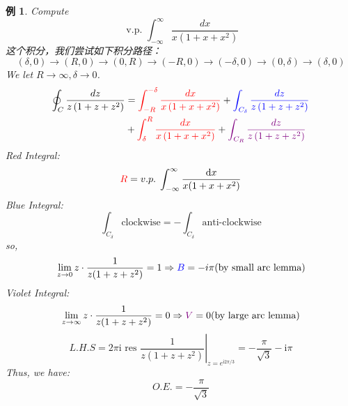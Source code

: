 \documentclass[10pt, a4paper, oneside]{ctexbook}
\newtheorem{example}[theorem]{例}
\def\D{\mathrm{d}}
\begin{document}
\begin{example}
    Compute $$\text { v.p. } \int_{-\infty}^{\infty} \frac{d x}{x\left(1+x+x^{2}\right)}$$
    \rm 这个积分，我们尝试如下积分路径：
    $$(\delta,0)\to(R,0)\to(0,R)\to(-R,0)\to(-\delta,0)\to(0,\delta)\to(\delta,0)$$
    We let $R\to\infty, \delta\to0$.
    $$
        \begin{aligned}
            \oint_{C} \frac{d z}{z\left(1+z+z^{2}\right)} & ={\color{red} \int_{-R}^{-\delta} \frac{d x}{x\left(1+x+x^{2}\right)}}+{\color{blue}\int_{C_{\delta}} \frac{d z}{z\left(1+z+z^{2}\right)}} \\
                                                          & +{\color{red}\int_{\delta}^{R} \frac{d x}{{x\left(1+x+x^{2}\right)}}} + {\color{violet}\int_{C_{R}} \frac{d z}{z\left(1+z+z^{2}\right)}}
        \end{aligned}
    $$
    {\color{red} Red Integral}:
    $$
        {\color{red} R}=v.p.\; \int_{-\infty}^\infty \frac{\D x}{x(1+x+x^2)}
    $$
    {\color{blue} Blue Integral}:
    $$
        \int_{C_\delta}\text{clockwise} = -\int_{C_\delta} \text{anti-clockwise}
    $$
    so,
    $$
        \lim_{z\to 0} z\cdot \frac{1}{z(1+z+z^2)}=1 \Rightarrow
        {\color{blue}B} =-i\pi (\text{by small arc lemma})
    $$
    {\color{violet} Violet Integral}:
    $$
        \lim_{z\to \infty} z\cdot \frac{1}{z(1+z+z^2)}=0 \Rightarrow
        {\color{violet} V}=0(\text{by large arc lemma})
    $$
    $$
        L.H.S= 2 \pi \mathrm{i} \text { res }\left.\frac{1}{z\left(1+z+z^{2}\right)}\right|_{z=e^{\mathrm{i} 2 \pi / 3}}=-\frac{\pi}{\sqrt{3}}-\mathrm{i} \pi
    $$
    Thus, we have:
    $$
        O.E.= -\frac{\pi}{\sqrt{3}}
    $$

\end{example}
\end{document}
